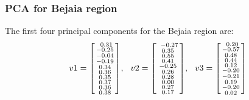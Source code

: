\documentclass[10pt]{article}
\numberwithin{equation}{section}
\numberwithin{figure}{section}
\numberwithin{table}{section}
\begin{document}
\subsubsection{PCA for Bejaia region}
The first four principal components for the Bejaia region are:
\begin{equation*}
    v1 = 
        \begin{bsmallmatrix}
            \
        0.31\\
        -0.25\\
        -0.04\\
        -0.19\\
        0.34\\
        0.36\\
        0.35\\
        0.37\\
        0.36\\
        0.38
           
        \end{bsmallmatrix}, \hspace{7pt}
    v2 = 
        \begin{bsmallmatrix}
           \
                -0.27\\
                0.35\\
                0.55\\
                0.41\\
                -0.25\\
                0.26\\
                0.28\\
                0.00\\
                0.27\\
                0.17
            
        \end{bsmallmatrix}, \hspace{7pt}
    v3 = 
        \begin{bsmallmatrix}
           \
                0.20\\
                -0.57\\
                0.48\\
                0.44\\
                0.12\\
                -0.20\\
                -0.21\\
                0.19\\
                -0.20\\
                0.02
            

\end{bsmallmatrix}
\end{equation*}
\end{document}
